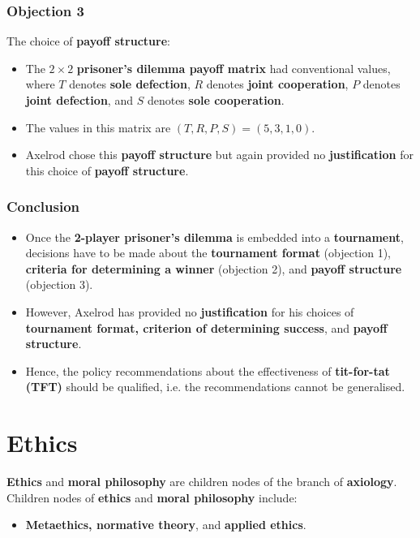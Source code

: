 \documentclass[11pt]{article}
\begin{document}
\subsubsection{Objection 3}
\label{sec:org358f036}
The choice of \textbf{payoff structure}:
\begin{itemize}
\item The \(2 \times 2\) \textbf{prisoner's dilemma payoff matrix} had conventional values, where \(T\) denotes \textbf{sole defection}, \(R\) denotes \textbf{joint cooperation}, \(P\) denotes \textbf{joint defection}, and \(S\) denotes \textbf{sole cooperation}.
\item The values in this matrix are \((T, R, P, S) = (5, 3, 1, 0)\).
\item Axelrod chose this \textbf{payoff structure} but again provided no \textbf{justification} for this choice of \textbf{payoff structure}.
\end{itemize}
\subsubsection{Conclusion}
\label{sec:org3dd5d8b}
\begin{itemize}
\item Once the \textbf{2-player prisoner's dilemma} is embedded into a \textbf{tournament}, decisions have to be made about the \textbf{tournament format} (objection 1), \textbf{criteria for determining a winner} (objection 2), and \textbf{payoff structure} (objection 3).
\item However, Axelrod has provided no \textbf{justification} for his choices of \textbf{tournament format, criterion of determining success}, and \textbf{payoff structure}.
\item Hence, the policy recommendations about the effectiveness of \textbf{tit-for-tat (TFT)} should be qualified, i.e. the recommendations cannot be generalised.
\end{itemize}

 \newpage
\section{Ethics}
\label{sec:orgce13848}
\textbf{Ethics} and \textbf{moral philosophy} are children nodes of the branch of \textbf{axiology}. Children nodes of \textbf{ethics} and \textbf{moral philosophy} include:
\begin{itemize}
\item \textbf{Metaethics, normative theory}, and \textbf{applied ethics}.
\end{itemize}
\end{document}
